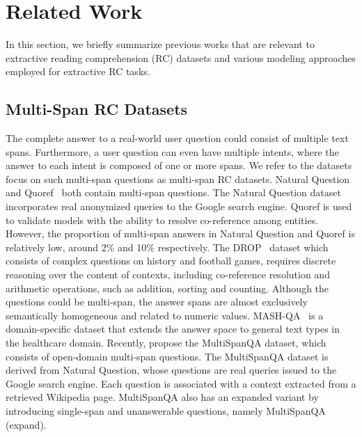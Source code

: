 
\section{Related Work}
\label{sec:related}
In this section, we briefly summarize previous works that are relevant to extractive reading comprehension
(RC) datasets and various modeling approaches employed for extractive RC tasks.
\subsection{Multi-Span RC Datasets}
The complete answer to a real-world user question could consist of multiple text spans. 
Furthermore, a user question can even have multiple intents, where the answer to each intent is composed of one or more spans. 
We refer to the datasets focus on such multi-span questions as multi-span RC datasets.
Natural Question~\citep{DBLP:journals/tacl/KwiatkowskiPRCP19} and Quoref~\citep{DBLP:conf/emnlp/DasigiLMSG19} both contain multi-span questions. 
The Natural Question dataset incorporates real anonymized queries to the Google search engine. 
Quoref is used to validate models with the ability to resolve co-reference among entities. %
However, the proportion of multi-span answers in Natural Question and Quoref is relatively low, around 2\% and 10\% respectively. 
The DROP~\citep{DBLP:conf/naacl/DuaWDSS019} dataset which consists of complex questions on history and football games, requires discrete reasoning over the content of contexts, including  co-reference resolution and arithmetic operations, such as addition, sorting and counting. 
Although the questions could be multi-span, the answer spans are almost exclusively semantically homogeneous and related to numeric values. 
MASH-QA~\citep{DBLP:conf/aaai/PangLGXSC19} is a domain-specific dataset that extends the answer space to general text types in the healthcare domain.
Recently, \cite{li2022multispanqa} propose the MultiSpanQA dataset, which consists of open-domain multi-span questions. The MultiSpanQA dataset is derived from Natural Question, whose questions are real queries issued to the Google search engine. 
Each question is associated with a context extracted from a retrieved Wikipedia page.  
MultiSpanQA also has an expanded variant by introducing single-span and unanswerable questions, namely MultiSpanQA (expand). 

